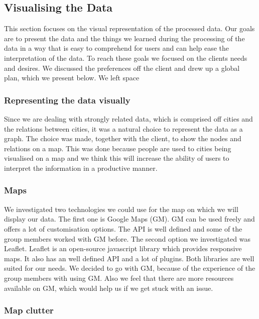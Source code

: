 \subsection{Visualising the Data}

This section focuses on the visual representation of the processed data. Our goals are to present the data and the things we learned during the processing of the data in a way that is easy to comprehend for users and can help ease the interpretation of the data.
To reach these goals we focused on the clients needs and desires. We discussed the preferences off the client and drew up a global plan, which we present below. We left space 

\subsubsection{Representing the data visually}

Since we are dealing with strongly related data, which is comprised off cities and the relations between cities, it was a natural choice to represent the data as a graph.
The choice was made, together with the client, to show the nodes and relations on a map. This was done because people are used to cities being visualised on a map and we think this will increase the ability of users to interpret the information in a productive manner.

\subsubsection{Maps}

We investigated two technologies we could use for the map on which we will display our data. The first one is Google Maps (GM). GM can be used freely and offers a lot of customisation options. The API is well defined and some of the group members worked with GM before. The second option we investigated was Leaflet. Leaflet is an open-source javascript library which provides responsive maps. It also has an well defined API and a lot of plugins.
Both libraries are well suited for our needs. 
We decided to go with GM, because of the experience of the group members with using GM. Also we feel that there are more resources available on GM, which would help us if we get stuck with an issue.

\subsubsection{Map clutter}

